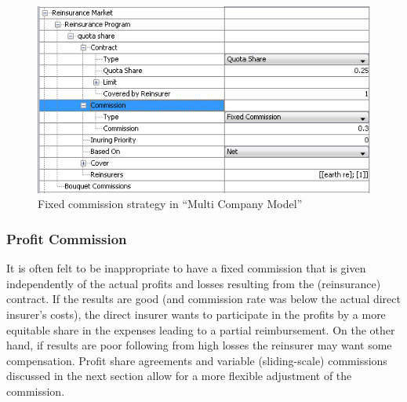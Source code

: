 \begin{figure}[htb]
	\centering
		\includegraphics[scale=0.8]{images/fixedCommission.png}
	\caption{Fixed commission strategy in ``Multi Company Model''}
	\label{fig:fixedCommission}
\end{figure}



\subsubsection{Profit Commission}
\label{subsubsec:profitCommission}

It is often felt to be inappropriate to have a fixed commission that is given
independently of the actual profits and losses resulting from the (reinsurance) contract.
If the results are good (and commission rate was below the actual direct insurer's costs),
the direct insurer wants to participate in the profits by a more equitable
share in the expenses leading to a partial reimbursement. On the other hand,
if results are poor following from high losses the reinsurer may want some compensation.
Profit share agreements and variable (sliding-scale) commissions discussed in the next section
allow for a more flexible adjustment of the commission.

